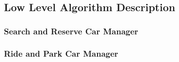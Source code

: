 \subsection{Low Level Algorithm Description}
\subsubsection{Search and Reserve Car Manager}
\subsubsection{Ride and Park Car Manager}






